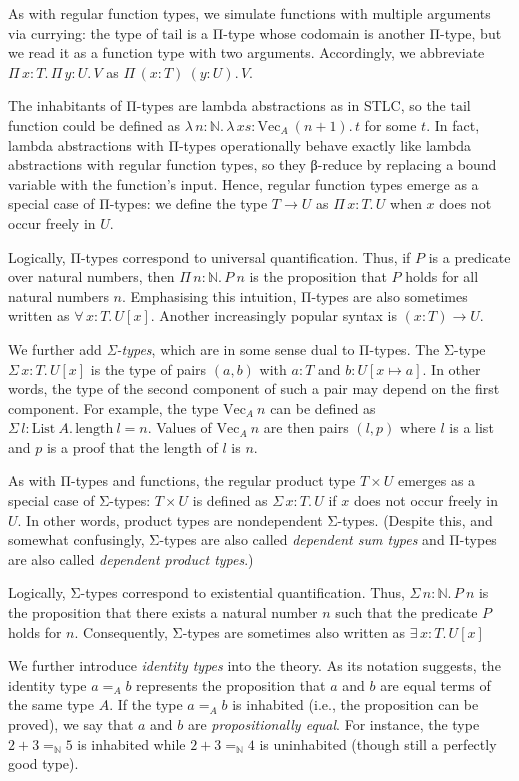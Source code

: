 \documentclass{scrartcl}
\theoremstyle{definition}
\newcommand{\Lam}[2]{λ\,#1.\, #2}
\newcommand{\All}[2]{∀\,#1.\, #2}
\newcommand{\Ex}[2]{∃\,#1.\, #2}
\newcommand{\PiT}[2]{Π\,#1.\, #2}
\newcommand{\SigT}[2]{Σ\,#1.\, #2}
\renewcommand{\Vec}{\ensuremath{\mathrm{Vec}}}
\newcommand{\List}{\ensuremath{\mathrm{List}}}
\newcommand{\tail}{\ensuremath{\mathrm{tail}}}
\newcommand{\length}{\ensuremath{\mathrm{length}}}
\begin{document}
As with regular function types, we simulate functions with multiple arguments via currying: the type of $\tail$ is a Π-type whose codomain is another Π-type, but we read it as a function type with two arguments.
Accordingly, we abbreviate $\PiT{x : T}{\PiT{y : U}{V}}$ as $\PiT{(x : T)~(y : U)}{V}$.

The inhabitants of Π-types are lambda abstractions as in STLC, so the $\tail$ function could be defined as $\Lam{n : ℕ}{\Lam{xs : \Vec_{A}~(n + 1)}{t}}$ for some $t$.
In fact, lambda abstractions with Π-types operationally behave exactly like lambda abstractions with regular function types, so they β-reduce by replacing a bound variable with the function's input.
Hence, regular function types emerge as a special case of Π-types: we define the type $T → U$ as $\PiT{x : T}{U}$ when $x$ does not occur freely in $U$.

Logically, Π-types correspond to universal quantification.
Thus, if $P$ is a predicate over natural numbers, then $\PiT{n : ℕ}{P~n}$ is the proposition that $P$ holds for all natural numbers $n$.
Emphasising this intuition, Π-types are also sometimes written as $\All{x : T}{U[x]}$.
Another increasingly popular syntax is $(x : T) → U$.

We further add \emph{Σ-types}, which are in some sense dual to Π-types.
The Σ-type $\SigT{x : T}{U[x]}$ is the type of pairs $(a, b)$ with $a : T$ and $b : U[x ↦ a]$.
In other words, the type of the second component of such a pair may depend on the first component.
For example, the type $\Vec_{A}~n$ can be defined as $\SigT{l : \List~A}{\length~l = n}$.
Values of $\Vec_{A}~n$ are then pairs $(l, p)$ where $l$ is a list and $p$ is a proof that the length of $l$ is $n$.

As with Π-types and functions, the regular product type $T × U$ emerges as a special case of Σ-types: $T × U$ is defined as $\SigT{x : T}{U}$ if $x$ does not occur freely in $U$.
In other words, product types are nondependent Σ-types.
(Despite this, and somewhat confusingly, Σ-types are also called \emph{dependent sum types} and Π-types are also called \emph{dependent product types}.)

Logically, Σ-types correspond to existential quantification.
Thus, $\SigT{n : ℕ}{P~n}$ is the proposition that there exists a natural number $n$ such that the predicate $P$ holds for $n$.
Consequently, Σ-types are sometimes also written as $\Ex{x : T}{U[x]}$

We further introduce \emph{identity types} into the theory.
As its notation suggests, the identity type $a =_{A} b$ represents the proposition that $a$ and $b$ are equal terms of the same type $A$.
If the type $a =_{A} b$ is inhabited (i.e., the proposition can be proved), we say that $a$ and $b$ are \emph{propositionally equal}.
For instance, the type $2 + 3 =_{ℕ} 5$ is inhabited while $2 + 3 =_{ℕ} 4$ is uninhabited (though still a perfectly good type).
\end{document}
